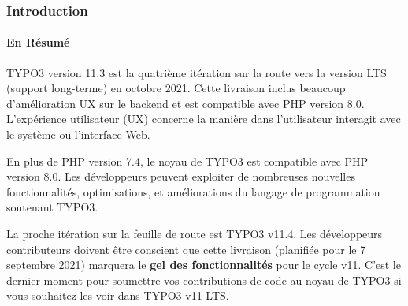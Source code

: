%

\begin{frame}[fragile]
	\frametitle{Introduction}
	\framesubtitle{En Résumé}

	\small
	    TYPO3 version 11.3 est la quatrième itération sur la route vers la version LTS
	    (support long-terme) en octobre 2021. Cette livraison inclus beaucoup
	    d'amélioration UX sur le backend et est compatible avec PHP version 8.0. L'expérience
	    utilisateur (UX) concerne la manière dans l'utilisateur interagit avec le système
	    ou l'interface Web.

		\vspace{0.2cm}

        En plus de PHP version 7.4, le noyau de TYPO3 est compatible avec PHP version 8.0.
        Les développeurs peuvent exploiter de nombreuses nouvelles fonctionnalités,
        optimisations, et améliorations du langage de programmation soutenant TYPO3.

		\vspace{0.2cm}

        La proche itération sur la feuille de route est TYPO3 v11.4. Les développeurs
        contributeurs doivent être conscient que cette livraison (planifiée pour le 7
        septembre 2021) marquera le \textbf{gel des fonctionnalités} pour le cycle v11.
        C'est le dernier moment pour soumettre vos contributions de code au noyau de TYPO3
        si vous souhaitez les voir dans TYPO3 v11 LTS.
	\normalsize

\end{frame}

